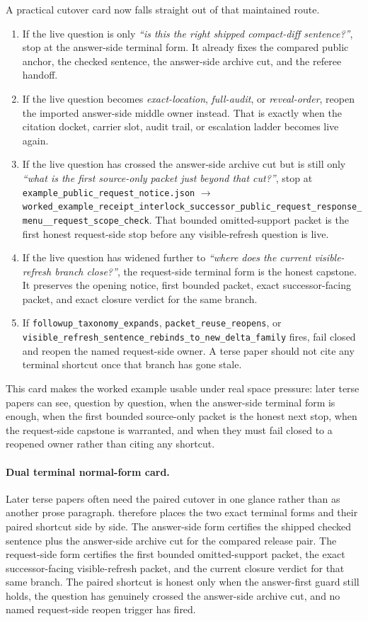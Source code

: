 \documentclass[11pt]{article}
\begin{document}
A practical cutover card now falls straight out of that maintained route.
\begin{enumerate}[leftmargin=1.5em]
\item If the live question is only \emph{``is this the right shipped compact-diff sentence?''}, stop at the answer-side terminal form. It already fixes the compared public anchor, the checked sentence, the answer-side archive cut, and the referee handoff.
\item If the live question becomes \emph{exact-location}, \emph{full-audit}, or \emph{reveal-order}, reopen the imported answer-side middle owner instead. That is exactly when the citation docket, carrier slot, audit trail, or escalation ladder becomes live again.
\item If the live question has crossed the answer-side archive cut but is still only \emph{``what is the first source-only packet just beyond that cut?''}, stop at \nolinkurl{example_public_request_notice.json} $\to$ \texttt{worked\_example\_receipt\_interlock\_successor\_public\_request\_response\_menu\_\_request\_scope\_check}. That bounded omitted-support packet is the first honest request-side stop before any visible-refresh question is live.
\item If the live question has widened further to \emph{``where does the current visible-refresh branch close?''}, the request-side terminal form is the honest capstone. It preserves the opening notice, first bounded packet, exact successor-facing packet, and exact closure verdict for the same branch.
\item If \texttt{followup\_taxonomy\_expands}, \texttt{packet\_reuse\_reopens}, or \texttt{visible\_refresh\_sentence\_rebinds\_to\_new\_delta\_family} fires, fail closed and reopen the named request-side owner. A terse paper should not cite any terminal shortcut once that branch has gone stale.
\end{enumerate}
\noindent This card makes the worked example usable under real space pressure: later terse papers can see, question by question, when the answer-side terminal form is enough, when the first bounded source-only packet is the honest next stop, when the request-side capstone is warranted, and when they must fail closed to a reopened owner rather than citing any shortcut.

\paragraph{Dual terminal normal-form card.}
Later terse papers often need the paired cutover in one glance rather than as another prose paragraph.
 therefore places the two exact terminal forms and their paired shortcut side by side.
The answer-side form certifies the shipped checked sentence plus the answer-side archive cut for the compared release pair.
The request-side form certifies the first bounded omitted-support packet, the exact successor-facing visible-refresh packet, and the current closure verdict for that same branch.
The paired shortcut is honest only when the answer-first guard still holds, the question has genuinely crossed the answer-side archive cut, and no named request-side reopen trigger has fired.
\end{document}
